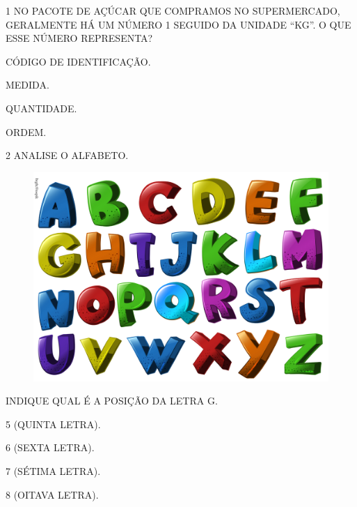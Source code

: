 \pagebreak

\num{1} NO PACOTE DE AÇÚCAR QUE COMPRAMOS NO SUPERMERCADO, GERALMENTE HÁ UM NÚMERO
1 SEGUIDO DA UNIDADE ``KG''. O QUE ESSE NÚMERO REPRESENTA?

\begin{escolha}[itemsep=0pt]
\item CÓDIGO DE IDENTIFICAÇÃO.

\item MEDIDA.

\item QUANTIDADE.

\item ORDEM.
\end{escolha}

\num{2} ANALISE O ALFABETO.


\begin{figure}[htpb!]
\centering
\includegraphics[width=.8\textwidth]{./media/SAEB_1ANO_MAT_FIGURA112.png}
\end{figure}

INDIQUE QUAL É A POSIÇÃO DA LETRA G.

\begin{escolha}[itemsep=0pt]
\item 5 (QUINTA LETRA).

\item 6 (SEXTA LETRA).

\item 7 (SÉTIMA LETRA).

\item 8 (OITAVA LETRA).
\end{escolha}

